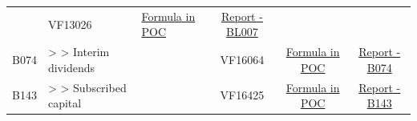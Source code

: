 \documentclass[]{book}
\begin{document}
\begin{longtable}[]{@{}cllccc@{}}
\begin{minipage}[t]{0.16\columnwidth}
\strut
\end{minipage} & \begin{minipage}[t]{0.09\columnwidth}\centering
VF13026\strut
\end{minipage} & \begin{minipage}[t]{0.15\columnwidth}\centering
\protect\hyperlink{bl007---formula-in-poc}{Formula in POC}\strut
\end{minipage} & \begin{minipage}[t]{0.16\columnwidth}\centering
\href{./Auxiliary\%20Files/technical_reports/variable_report/BL007.pdf}{Report - BL007}\strut
\end{minipage}\tabularnewline
\begin{minipage}[t]{0.08\columnwidth}\centering
B074\strut
\end{minipage} & \begin{minipage}[t]{0.20\columnwidth}\raggedright
\textgreater{} \textgreater{} Interim dividends\strut
\end{minipage} & \begin{minipage}[t]{0.16\columnwidth}\raggedright
\strut
\end{minipage} & \begin{minipage}[t]{0.09\columnwidth}\centering
VF16064\strut
\end{minipage} & \begin{minipage}[t]{0.15\columnwidth}\centering
\protect\hyperlink{b074---formula-in-poc}{Formula in POC}\strut
\end{minipage} & \begin{minipage}[t]{0.16\columnwidth}\centering
\href{./Auxiliary\%20Files/technical_reports/variable_report/B074(!).pdf}{Report - B074}\strut
\end{minipage}\tabularnewline
\begin{minipage}[t]{0.08\columnwidth}\centering
B143\strut
\end{minipage} & \begin{minipage}[t]{0.20\columnwidth}\raggedright
\textgreater{} \textgreater{} Subscribed capital\strut
\end{minipage} & \begin{minipage}[t]{0.16\columnwidth}\raggedright
\strut
\end{minipage} & \begin{minipage}[t]{0.09\columnwidth}\centering
VF16425\strut
\end{minipage} & \begin{minipage}[t]{0.15\columnwidth}\centering
\protect\hyperlink{b143---formula-in-poc}{Formula in POC}\strut
\end{minipage} & \begin{minipage}[t]{0.16\columnwidth}\centering
\href{./Auxiliary\%20Files/technical_reports/variable_report/B143.pdf}{Report - B143}\strut
\end{minipage}\tabularnewline
\bottomrule
\end{longtable}
\end{document}
